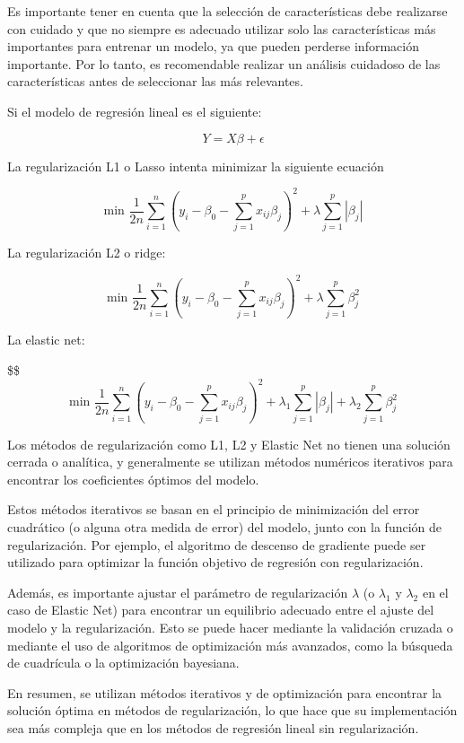 \documentclass[
  letterpaper,
  DIV=11,
  numbers=noendperiod]{scrartcl}
\begin{document}
Es importante tener en cuenta que la selección de características debe
realizarse con cuidado y que no siempre es adecuado utilizar solo las
características más importantes para entrenar un modelo, ya que pueden
perderse información importante. Por lo tanto, es recomendable realizar
un análisis cuidadoso de las características antes de seleccionar las
más relevantes.

Si el modelo de regresión lineal es el siguiente:

\[
Y=X\beta+\epsilon
\]

La regularización L1 o Lasso intenta minimizar la siguiente ecuación

\[
\text{min } \frac{1}{2n} \sum_{i=1}^{n}(y_i - \beta_0 - \sum_{j=1}^{p}x_{ij}\beta_j)^2 + \lambda\sum_{j=1}^{p}|\beta_j|
\]

La regularización L2 o ridge:

\[
\text{min } \frac{1}{2n} \sum_{i=1}^{n}(y_i - \beta_0 - \sum_{j=1}^{p}x_{ij}\beta_j)^2 + \lambda\sum_{j=1}^{p}\beta_j^2
\]

La elastic net:

\$\$
\[\text{min } \frac{1}{2n} \sum_{i=1}^{n}(y_i - \beta_0 - \sum_{j=1}^{p}x_{ij}\beta_j)^2 + \lambda_1\sum_{j=1}^{p}|\beta_j| + \lambda_2\sum_{j=1}^{p}\beta_j^2
\]

Los métodos de regularización como L1, L2 y Elastic Net no tienen una
solución cerrada o analítica, y generalmente se utilizan métodos
numéricos iterativos para encontrar los coeficientes óptimos del modelo.

Estos métodos iterativos se basan en el principio de minimización del
error cuadrático (o alguna otra medida de error) del modelo, junto con
la función de regularización. Por ejemplo, el algoritmo de descenso de
gradiente puede ser utilizado para optimizar la función objetivo de
regresión con regularización.

Además, es importante ajustar el parámetro de regularización \(\lambda\)
(o \(\lambda_1\) y \(\lambda_2\) en el caso de Elastic Net) para
encontrar un equilibrio adecuado entre el ajuste del modelo y la
regularización. Esto se puede hacer mediante la validación cruzada o
mediante el uso de algoritmos de optimización más avanzados, como la
búsqueda de cuadrícula o la optimización bayesiana.

En resumen, se utilizan métodos iterativos y de optimización para
encontrar la solución óptima en métodos de regularización, lo que hace
que su implementación sea más compleja que en los métodos de regresión
lineal sin regularización.
\end{document}
